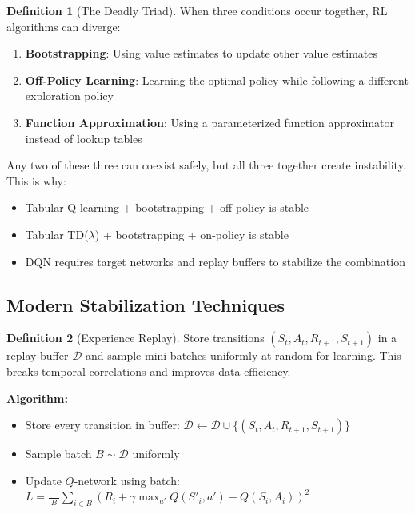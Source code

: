 \documentclass[12pt,a4paper]{article}
\theoremstyle{definition}
\newtheorem{definition}{Definition}[section]
\begin{document}
\begin{definition}[The Deadly Triad]
When three conditions occur together, RL algorithms can diverge:
\begin{enumerate}
    \item \textbf{Bootstrapping}: Using value estimates to update other value estimates
    \item \textbf{Off-Policy Learning}: Learning the optimal policy while following a different exploration policy
    \item \textbf{Function Approximation}: Using a parameterized function approximator instead of lookup tables
\end{enumerate}

Any two of these three can coexist safely, but all three together create instability. This is why:
\begin{itemize}
    \item Tabular Q-learning + bootstrapping + off-policy is stable
    \item Tabular TD($\lambda$) + bootstrapping + on-policy is stable
    \item DQN requires target networks and replay buffers to stabilize the combination
\end{itemize}
\end{definition}

\subsection{Modern Stabilization Techniques}

\begin{definition}[Experience Replay]
Store transitions $(S_t, A_t, R_{t+1}, S_{t+1})$ in a replay buffer $\mathcal{D}$ and sample mini-batches uniformly at random for learning. This breaks temporal correlations and improves data efficiency.

\textbf{Algorithm:}
\begin{itemize}
    \item Store every transition in buffer: $\mathcal{D} \leftarrow \mathcal{D} \cup \{(S_t, A_t, R_{t+1}, S_{t+1})\}$
    \item Sample batch $B \sim \mathcal{D}$ uniformly
    \item Update $Q$-network using batch: $L = \frac{1}{|B|} \sum_{i \in B} (R_i + \gamma \max_{a'} Q(S'_i, a') - Q(S_i, A_i))^2$
\end{itemize}
\end{definition}
\end{document}
